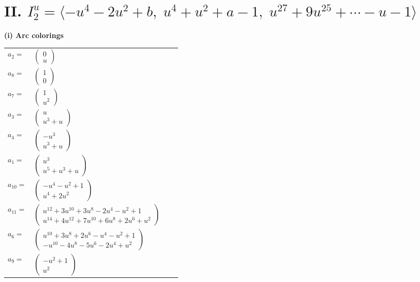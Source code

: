 \documentclass[1p]{elsarticle_modified}
\theoremstyle{definition}
\begin{document}
\centering \section*{II. $I^u_{2}= \langle - u^4-2 u^2+b,\;u^4+u^2+a-1,\;u^{27}+9 u^{25}+\cdots- u-1 \rangle$}
\flushleft \textbf{(i) Arc colorings}\\
\begin{tabular}{m{7pt} m{180pt} m{7pt} m{180pt} }
\flushright $a_{2}=$&$\begin{pmatrix}0\\u\end{pmatrix}$ \\
\flushright $a_{8}=$&$\begin{pmatrix}1\\0\end{pmatrix}$ \\
\flushright $a_{7}=$&$\begin{pmatrix}1\\u^2\end{pmatrix}$ \\
\flushright $a_{3}=$&$\begin{pmatrix}u\\u^3+u\end{pmatrix}$ \\
\flushright $a_{4}=$&$\begin{pmatrix}- u^3\\u^3+u\end{pmatrix}$ \\
\flushright $a_{1}=$&$\begin{pmatrix}u^3\\u^5+u^3+u\end{pmatrix}$ \\
\flushright $a_{10}=$&$\begin{pmatrix}- u^4- u^2+1\\u^4+2 u^2\end{pmatrix}$ \\
\flushright $a_{11}=$&$\begin{pmatrix}u^{12}+3 u^{10}+3 u^8-2 u^4- u^2+1\\u^{14}+4 u^{12}+7 u^{10}+6 u^8+2 u^6+u^2\end{pmatrix}$ \\
\flushright $a_{6}=$&$\begin{pmatrix}u^{10}+3 u^8+2 u^6- u^4- u^2+1\\- u^{10}-4 u^8-5 u^6-2 u^4+u^2\end{pmatrix}$ \\
\flushright $a_{9}=$&$\begin{pmatrix}- u^2+1\\u^2\end{pmatrix}$ \\

\end{tabular}
\end{document}

